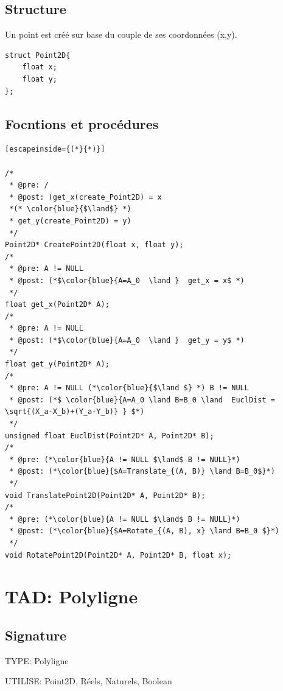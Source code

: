 \documentclass[a4paper, 11pt, oneside]{article}
\begin{document}
\subsection{Structure}
Un point est créé sur base du couple de ses coordonnées (x,y). 

\begin{lstlisting}
struct Point2D{
	float x;
	float y;
};
\end{lstlisting}

\subsection{Focntions et procédures}

\begin{lstlisting}[escapeinside={(*}{*)}]

/* 
 * @pre: /
 * @post: (get_x(create_Point2D) = x 
 *(* \color{blue}{$\land$} *)
 * get_y(create_Point2D) = y) 
 */
Point2D* CreatePoint2D(float x, float y);
/* 
 * @pre: A != NULL
 * @post: (*$\color{blue}{A=A_0  \land }  get_x = x$ *)
 */
float get_x(Point2D* A);
/* 
 * @pre: A != NULL
 * @post: (*$\color{blue}{A=A_0  \land }  get_y = y$ *)
 */
float get_y(Point2D* A);
/* 
 * @pre: A != NULL (*\color{blue}{$\land $} *) B != NULL
 * @post: (*$ \color{blue}{A=A_0 \land B=B_0 \land  EuclDist = \sqrt{(X_a-X_b)+(Y_a-Y_b)} } $*)
 */
unsigned float EuclDist(Point2D* A, Point2D* B);
/* 
 * @pre: (*\color{blue}{A != NULL $\land$ B != NULL}*)
 * @post: (*\color{blue}{$A=Translate_{(A, B)} \land B=B_0$}*)
 */
void TranslatePoint2D(Point2D* A, Point2D* B);
/* 
 * @pre: (*\color{blue}{A != NULL $\land$ B != NULL}*)
 * @post: (*\color{blue}{$A=Rotate_{(A, B), x} \land B=B_0 $}*)
 */
void RotatePoint2D(Point2D* A, Point2D* B, float x);
\end{lstlisting}


\section{TAD: Polyligne}

\subsection{Signature}

\noindent TYPE: Polyligne

\noindent UTILISE: Point2D, Réels, Naturels, Boolean
\end{document}
